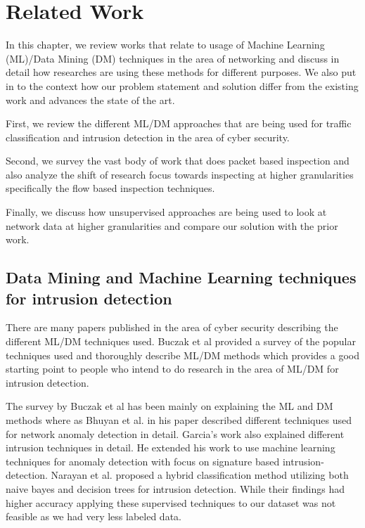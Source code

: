 
\chapter{Related Work}

In this chapter, we review works that relate to usage of Machine Learning (ML)/Data Mining (DM) techniques in the area of networking and discuss in detail how researches are using these methods for different purposes. We also put in to the context how our problem statement and solution differ from the existing work and advances the state of the art.

First, we review the different ML/DM approaches that are being used for traffic classification and intrusion detection in the area of cyber security.

Second, we survey the vast body of work that does packet based inspection and also analyze the shift of research focus towards inspecting at higher granularities specifically the flow based inspection techniques.

Finally, we discuss how unsupervised approaches are being used to look at network data at higher granularities and compare our solution with the prior work. 



\section{Data Mining and Machine Learning techniques for intrusion detection}

There are many papers published in the area of cyber security describing the different ML/DM techniques used. Buczak et al \cite{buczak2016survey} provided a survey of  the popular techniques used and thoroughly describe ML/DM methods which provides a good starting point to people who intend to do research in the area of ML/DM for intrusion detection.

The survey by Buczak et al \cite{buczak2016survey} has been mainly on explaining the ML and DM methods where as Bhuyan et al. \cite{bhuyan2014network} in his paper described different techniques used for network anomaly detection in detail. Garcia's work \cite{garcia2009anomaly} also explained different intrusion techniques in detail. He extended his work to  use machine learning techniques for anomaly detection with focus on signature based intrusion-detection.
Narayan et al. \cite{peddabachigari2007modeling} proposed a hybrid classification method utilizing both naive bayes and decision trees for intrusion detection. While their findings had higher accuracy applying these supervised techniques to our dataset was not feasible as we had very less labeled data.

